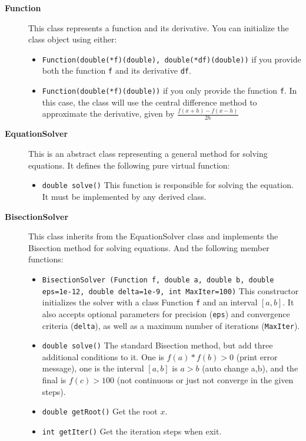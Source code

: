 \documentclass[a4paper]{article}
\begin{document}
\begin{description}
	\item[\textbf{Function}] This class represents a function and its derivative. You can initialize the class object using either:
	\begin{itemize}
		\item \texttt{Function(double(*f)(double), double(*df)(double))} if you provide both the function \texttt{f} and its derivative \texttt{df}.
		\item \texttt{Function(double(*f)(double))} if you only provide the function \texttt{f}. In this case, the class will use the central difference method to approximate the derivative, given by $\frac{f(x+h) - f(x-h)}{2h}$
	\end{itemize}

	\item[\textbf{EquationSolver}] This is an abstract class representing a general method for solving equations. It defines the following pure virtual function:
	\begin{itemize}
		\item \texttt{double solve()} This function is responsible for solving the equation. It must be implemented by any derived class.
	\end{itemize}

	\item[\textbf{BisectionSolver}] This class inherits from the EquationSolver class and implements the Bisection method for solving equations. And the following member functions:
	\begin{itemize}
		\item \texttt{BisectionSolver (Function f, double a, double b, double eps=1e-12, double delta=1e-9, int MaxIter=100)} This constructor initializes the solver with a class Function \texttt{f} and an interval $[a, b]$. It also accepts optional parameters for precision (\texttt{eps}) and convergence criteria (\texttt{delta}), as well as a maximum number of iterations (\texttt{MaxIter}).
		\item \texttt{double solve()} The standard Bisection method, but add three additional conditions to it. One is $f(a)*f(b) > 0$ (print error message), one is the interval $[a,b]$ is $a>b$ (auto change a,b), and the final is $f(c) > 100$ (not continuous or just not converge in the given steps).
		\item \texttt{double getRoot()} Get the root $x$. 
		\item \texttt{int getIter()} Get the iteration steps when exit. 
	\end{itemize}
	

\end{description}
\end{document}
